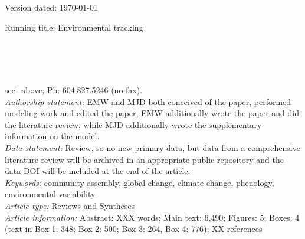 \documentclass[11pt,letterpaper]{article}
\begin{document}
\begin{flushright}
Version dated: \today
\end{flushright}
\bigskip
\noindent Running title: Environmental tracking 
\bigskip
\medskip
\begin{center}
\\
\bigskip
{}\\
\\
\medskip
\end{center}
 see$^{1}$ above; Ph: 604.827.5246 (no fax).\\

\noindent \emph{Authorship statement:} EMW and MJD both conceived of the paper, performed modeling work and edited the paper, EMW additionally wrote the paper and did the literature review, while MJD additionally wrote the supplementary information on the model.  \\
\noindent \emph{Data statement:} Review, so no new primary data, but data from a comprehensive literature review will be archived in an appropriate public repository and the data DOI will be included at the end of the article. \\
\noindent \emph{Keywords:} community assembly, global change, climate change, phenology, environmental variability\\
\noindent \emph{Article type:} Reviews and Syntheses\\
\noindent \emph{Article information:} Abstract: XXX words; Main text: 6,490; Figures: 5; Boxes: 4 (text in Box 1: 348; Box 2: 500; Box 3: 264, Box 4: 776); XX references
\newpage
\end{document}
